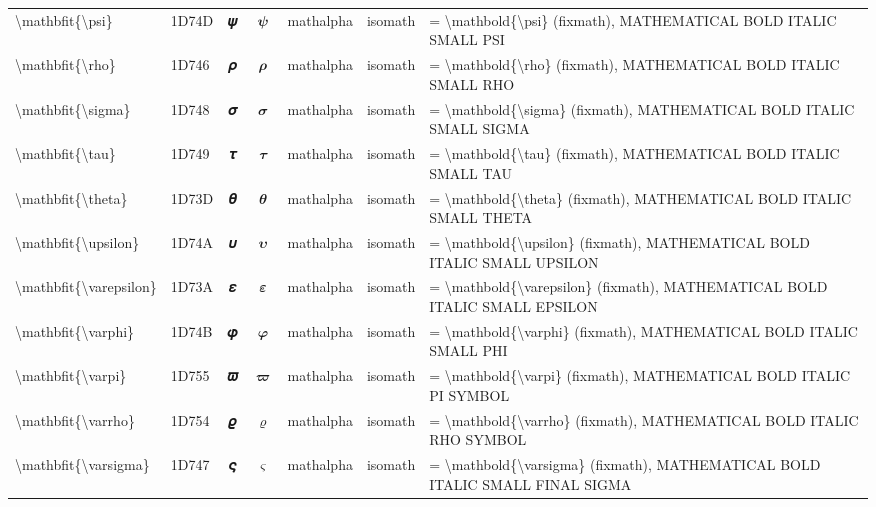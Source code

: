 \documentclass[a4paper,landscape]{article}
\begin{document}
\begin{longtable}{llcclll}
\textbackslash{}mathbfit\{\textbackslash{}psi\} & 1D74D & 𝝍 & $\mathbfit{\psi}$ & mathalpha & isomath & = \textbackslash{}mathbold\{\textbackslash{}psi\} (fixmath), MATHEMATICAL BOLD ITALIC SMALL PSI \\
\textbackslash{}mathbfit\{\textbackslash{}rho\} & 1D746 & 𝝆 & $\mathbfit{\rho}$ & mathalpha & isomath & = \textbackslash{}mathbold\{\textbackslash{}rho\} (fixmath), MATHEMATICAL BOLD ITALIC SMALL RHO \\
\textbackslash{}mathbfit\{\textbackslash{}sigma\} & 1D748 & 𝝈 & $\mathbfit{\sigma}$ & mathalpha & isomath & = \textbackslash{}mathbold\{\textbackslash{}sigma\} (fixmath), MATHEMATICAL BOLD ITALIC SMALL SIGMA \\
\textbackslash{}mathbfit\{\textbackslash{}tau\} & 1D749 & 𝝉 & $\mathbfit{\tau}$ & mathalpha & isomath & = \textbackslash{}mathbold\{\textbackslash{}tau\} (fixmath), MATHEMATICAL BOLD ITALIC SMALL TAU \\
\textbackslash{}mathbfit\{\textbackslash{}theta\} & 1D73D & 𝜽 & $\mathbfit{\theta}$ & mathalpha & isomath & = \textbackslash{}mathbold\{\textbackslash{}theta\} (fixmath), MATHEMATICAL BOLD ITALIC SMALL THETA \\
\textbackslash{}mathbfit\{\textbackslash{}upsilon\} & 1D74A & 𝝊 & $\mathbfit{\upsilon}$ & mathalpha & isomath & = \textbackslash{}mathbold\{\textbackslash{}upsilon\} (fixmath), MATHEMATICAL BOLD ITALIC SMALL UPSILON \\
\textbackslash{}mathbfit\{\textbackslash{}varepsilon\} & 1D73A & 𝜺 & $\mathbfit{\varepsilon}$ & mathalpha & isomath & = \textbackslash{}mathbold\{\textbackslash{}varepsilon\} (fixmath), MATHEMATICAL BOLD ITALIC SMALL EPSILON \\
\textbackslash{}mathbfit\{\textbackslash{}varphi\} & 1D74B & 𝝋 & $\mathbfit{\varphi}$ & mathalpha & isomath & = \textbackslash{}mathbold\{\textbackslash{}varphi\} (fixmath), MATHEMATICAL BOLD ITALIC SMALL PHI \\
\textbackslash{}mathbfit\{\textbackslash{}varpi\} & 1D755 & 𝝕 & $\mathbfit{\varpi}$ & mathalpha & isomath & = \textbackslash{}mathbold\{\textbackslash{}varpi\} (fixmath), MATHEMATICAL BOLD ITALIC PI SYMBOL \\
\textbackslash{}mathbfit\{\textbackslash{}varrho\} & 1D754 & 𝝔 & $\mathbfit{\varrho}$ & mathalpha & isomath & = \textbackslash{}mathbold\{\textbackslash{}varrho\} (fixmath), MATHEMATICAL BOLD ITALIC RHO SYMBOL \\
\textbackslash{}mathbfit\{\textbackslash{}varsigma\} & 1D747 & 𝝇 & $\mathbfit{\varsigma}$ & mathalpha & isomath & = \textbackslash{}mathbold\{\textbackslash{}varsigma\} (fixmath), MATHEMATICAL BOLD ITALIC SMALL FINAL SIGMA \\

\end{longtable}
\end{document}
